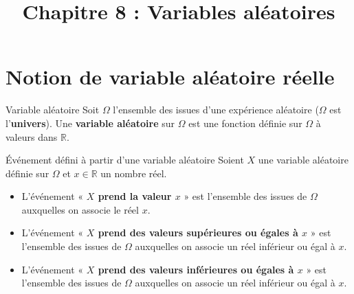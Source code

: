 \documentclass[11pt]{article}
\title{Chapitre 8 : Variables aléatoires}
\date{}
\author{}
\begin{document}
\maketitle\thispagestyle{fancy}

\section{Notion de variable aléatoire réelle}

\begin{defi}{Variable aléatoire}
  Soit $\Omega$ l'ensemble des issues d'une expérience aléatoire ($\Omega$ est
  l'\textbf{univers}). Une \textbf{variable aléatoire} sur $\Omega$ est une
  fonction définie sur $\Omega$ à valeurs dans $\mathbb{R}$.
\end{defi}

\begin{defi}{Événement défini à partir d'une variable aléatoire}
  Soient $X$ une variable aléatoire définie sur $\Omega$ et $x\in\mathbb{R}$ un
  nombre réel.
  \begin{itemize}
    \item L'événement « \textbf{$X$ prend la valeur $x$} » est l'ensemble des
      issues de $\Omega$ auxquelles on associe le réel $x$.
    \item L'événement « \textbf{$X$ prend des valeurs supérieures ou égales
      à $x$} » est l'ensemble des
      issues de $\Omega$ auxquelles on associe un réel inférieur ou égal à $x$.
    \item L'événement « \textbf{$X$ prend des valeurs inférieures ou égales
      à $x$} » est l'ensemble des
      issues de $\Omega$ auxquelles on associe un réel inférieur ou égal à $x$.
  \end{itemize}
\end{defi}
\end{document}

